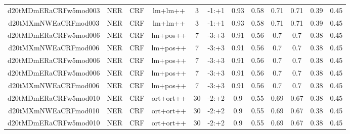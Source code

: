 \documentclass[a4paper]{article}
\begin{document}
\begin{landscape}
\begin{center}
\begin{tabular}{ |c|c|c|c|c|c|c|c|c|c|c|c|}
 
 	
 	\small{ d20tMDmERaCRFw5mod003 } & \small{ NER} & \small{  CRF }  & lm+lm++  &  3 &  \small{  -1:+1 }  &  0.93 & 0.58 & 0.71  &  0.71 & 0.39 & 0.45 \\
 	

 
 	
 	\small{ d20tMXmNWEaCRFmod003 } & \small{ NER} & \small{  CRF }  & lm+lm++  &  3 &  \small{  -1:+1 }  &  0.93 & 0.58 & 0.71  &  0.71 & 0.39 & 0.45 \\
 	

 
 	
 	\small{ d20tMDmERaCRFw5mod006 } & \small{ NER} & \small{  CRF }  & lm+pos++  &  7 &  \small{  -3:+3 }  &  0.91 & 0.56 & 0.7  &  0.7 & 0.38 & 0.45 \\
 	

 
 	
 	\small{ d20tMXmNWEaCRFmod006 } & \small{ NER} & \small{  CRF }  & lm+pos++  &  7 &  \small{  -3:+3 }  &  0.91 & 0.56 & 0.7  &  0.7 & 0.38 & 0.45 \\
 	

 
 	
 	\small{ d20tMDmERaCRFw5mod006 } & \small{ NER} & \small{  CRF }  & lm+pos++  &  7 &  \small{  -3:+3 }  &  0.91 & 0.56 & 0.7  &  0.7 & 0.38 & 0.45 \\
 	

 
 	
 	\small{ d20tMDmERaCRFw5mod006 } & \small{ NER} & \small{  CRF }  & lm+pos++  &  7 &  \small{  -3:+3 }  &  0.91 & 0.56 & 0.7  &  0.7 & 0.38 & 0.45 \\
 	

 
 	
 	\small{ d20tMXmNWEaCRFmod006 } & \small{ NER} & \small{  CRF }  & lm+pos++  &  7 &  \small{  -3:+3 }  &  0.91 & 0.56 & 0.7  &  0.7 & 0.38 & 0.45 \\
 	

 
 	
 	\small{ d20tMDmERaCRFw5mod010 } & \small{ NER} & \small{  CRF }  & ort+ort++  &  30 &  \small{  -2:+2 }  &  0.9 & 0.55 & 0.69  &  0.67 & 0.38 & 0.45 \\
 	

 
 	
 	\small{ d20tMXmNWEaCRFmod010 } & \small{ NER} & \small{  CRF }  & ort+ort++  &  30 &  \small{  -2:+2 }  &  0.9 & 0.55 & 0.69  &  0.67 & 0.38 & 0.45 \\
 	

 
 	
 	\small{ d20tMDmERaCRFw5mod010 } & \small{ NER} & \small{  CRF }  & ort+ort++  &  30 &  \small{  -2:+2 }  &  0.9 & 0.55 & 0.69  &  0.67 & 0.38 & 0.45 \\
 	


\end{tabular}
\end{center}
\end{landscape}
\end{document}

